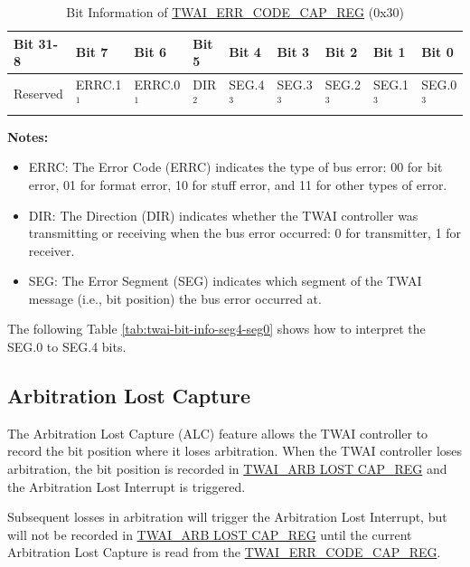 \documentclass[main\_\_EN.tex]{subfiles}
\begin{document}
\begin{longtable}[c]{|p{1.4cm}|p{1.4cm}|p{1.4cm}|p{1.4cm}|p{1.4cm}|p{1.4cm}|p{1.4cm}|p{1.4cm}|p{1.4cm}|}
    \caption{Bit Information of \hyperref[regdesc:TWAIERRCODECAPREG]{TWAI\_ERR\_CODE\_CAP\_REG} (0x30)}
    \label{tab:twai-bit-info-error-code-cap-reg}\\
    \hline
    \rowcolor{lightgray}
    \textbf{Bit 31-8} & \textbf{Bit 7} & \textbf{Bit 6} & \textbf{Bit 5} & \textbf{Bit 4} & \textbf{Bit 3} & \textbf{Bit 2} & \textbf{Bit 1} & \textbf{Bit 0}\\\hline
    Reserved & ERRC.1$^1$ & ERRC.0$^1$ & DIR$^2$ & SEG.4$^3$ & SEG.3$^3$ & SEG.2$^3$ & SEG.1$^3$ & SEG.0$^3$\\
    \hline
\end{longtable}
\vspace{-1.5em}
{\bfseries Notes:}\\
\begin{itemize}
    \item ERRC: The Error Code (ERRC) indicates the type of bus error: 00 for bit error, 01 for format error, 10 for stuff error, and 11 for other types of error.
    \item DIR: The Direction (DIR) indicates whether the TWAI controller was transmitting or receiving when the bus error occurred: 0 for transmitter, 1 for receiver.
    \item SEG: The Error Segment (SEG) indicates which segment of the TWAI message (i.e., bit position) the bus error occurred at.
\end{itemize}

The following Table \ref{tab:twai-bit-info-seg4-seg0} shows how to interpret the SEG.0 to SEG.4 bits.



\subsection{Arbitration Lost Capture}

The Arbitration Lost Capture (ALC) feature allows the TWAI controller to record the bit position where it loses arbitration. When the TWAI controller loses arbitration, the bit position is recorded in \hyperref[regdesc:TWAIARB LOST CAPREG]{TWAI\_ARB LOST CAP\_REG} and the Arbitration Lost Interrupt is triggered.

Subsequent losses in arbitration will trigger the Arbitration Lost Interrupt, but will not be recorded in \hyperref[regdesc:TWAIARB LOST CAPREG]{TWAI\_ARB LOST CAP\_REG} until the current Arbitration Lost Capture is read from the \hyperref[regdesc:TWAIERRCODECAPREG]{TWAI\_ERR\_CODE\_CAP\_REG}.
\end{document}

